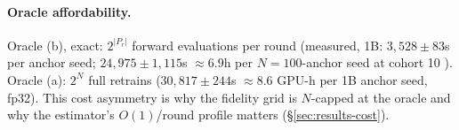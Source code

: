 \paragraph{Oracle affordability.}
Oracle (b), exact: $2^{|P_r|}$ forward evaluations per round (measured, 1B:
$3{,}528\pm83$s per anchor seed; $24{,}975\pm1{,}115$s $\approx 6.9$h per
$N{=}100$-anchor seed at cohort 10 ). Oracle
(a): $2^N$ full retrains ($30{,}817\pm244$s $\approx 8.6$ GPU-h per 1B anchor
seed, fp32). This cost asymmetry is why the fidelity grid is $N$-capped at the
oracle and why the estimator's $O(1)$/round profile matters
(\S\ref{sec:results-cost}).
